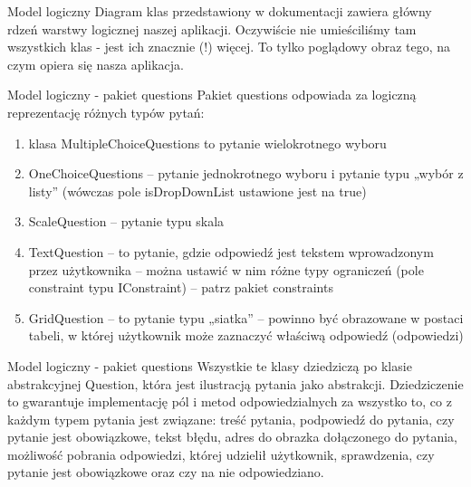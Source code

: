 \documentclass[a4paper,10pt]{beamer}
\begin{document}
		
		\begin{frame}{Model logiczny}
			Diagram klas przedstawiony w dokumentacji zawiera główny rdzeń warstwy logicznej naszej aplikacji. Oczywiście nie umieściliśmy tam wszystkich klas - jest ich znacznie (!) więcej. To tylko poglądowy obraz tego, na czym opiera się nasza aplikacja.
		\end{frame}
		\begin{frame}{Model logiczny - pakiet questions}
			Pakiet questions odpowiada za logiczną reprezentację różnych typów pytań: 
			\begin{enumerate}
			\item	klasa MultipleChoiceQuestions to pytanie wielokrotnego wyboru
			\item	OneChoiceQuestions – pytanie jednokrotnego wyboru i pytanie typu „wybór z listy” (wówczas pole isDropDownList ustawione jest na true)
			\item	ScaleQuestion – pytanie typu skala
			\item	TextQuestion – to pytanie, gdzie odpowiedź jest tekstem wprowadzonym przez użytkownika – można ustawić w nim różne typy ograniczeń (pole constraint typu IConstraint) – patrz pakiet constraints
			\item	GridQuestion – to pytanie typu „siatka” – powinno być obrazowane w postaci tabeli, w której użytkownik może zaznaczyć właściwą odpowiedź (odpowiedzi)
		\end{enumerate}	
	\end{frame}
	\begin{frame}{Model logiczny - pakiet questions}
		Wszystkie te klasy dziedziczą po klasie abstrakcyjnej Question, która jest ilustracją pytania jako abstrakcji. Dziedziczenie to gwarantuje implementację pól i metod odpowiedzialnych za wszystko to, co z każdym typem pytania jest związane: treść pytania, podpowiedź do pytania, czy pytanie jest obowiązkowe, tekst błędu, adres do obrazka dołączonego do pytania, możliwość pobrania odpowiedzi, której udzielił użytkownik, sprawdzenia, czy pytanie jest obowiązkowe oraz czy na nie odpowiedziano.
	\end{frame}
\end{document}
